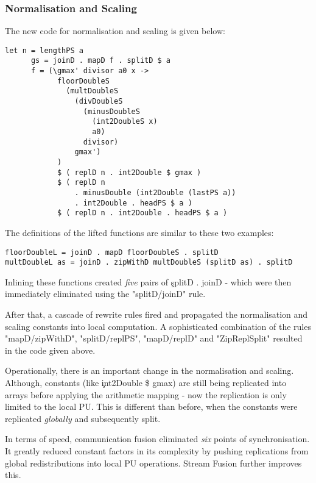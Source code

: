     \subsubsection{Normalisation and Scaling}
    The new code for normalisation and scaling is given below:
    \begin{lstlisting}
let n = lengthPS a
      gs = joinD . mapD f . splitD $ a
      f = (\gmax' divisor a0 x ->
            floorDoubleS
              (multDoubleS
                (divDoubleS
                  (minusDoubleS
                    (int2DoubleS x)
                    a0)
                  divisor)
                gmax')
            )
            $ ( replD n . int2Double $ gmax )
            $ ( replD n
                . minusDouble (int2Double (lastPS a))
                . int2Double . headPS $ a )
            $ ( replD n . int2Double . headPS $ a )
    \end{lstlisting}
    The definitions of the lifted functions are similar to these two examples:
    \begin{lstlisting}
floorDoubleL = joinD . mapD floorDoubleS . splitD
multDoubleL as = joinD . zipWithD multDoubleS (splitD as) . splitD
    \end{lstlisting}
    Inlining these functions created \emph{five} pairs of \c{splitD . joinD} - which were then immediately
    eliminated using the "splitD/joinD" rule.
    
    After that, a cascade of rewrite rules fired and propagated the normalisation and scaling
    constants into local computation. A sophisticated combination of the rules
    "mapD/zipWithD", "splitD/replPS", "mapD/replD" and "ZipReplSplit" resulted in
    the code given above.
    
    Operationally, there is an important change in the normalisation and scaling.
    Although, constants (like \c{int2Double \$ gmax}) are still being replicated into arrays
    before applying the arithmetic mapping - now the replication
    is only limited to the local PU. This is different than before, when
    the constants were replicated \emph{globally} and subsequently split.
    
    In terms of speed, communication fusion eliminated \emph{six} points of synchronisation.
    It greatly reduced constant factors in its complexity by pushing
    replications from global redistributions into local PU operations.
    Stream Fusion further improves this.
    
